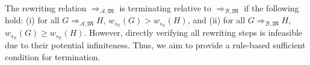 The rewriting relation \( \Rightarrow_{\mathcal{A},\mathfrak{M}} \) is terminating relative to $\Rightarrow_{\mathcal{B},\mathfrak{M}}$ if the following hold: (i) for all \(G \Rightarrow_{\mathcal{A},\mathfrak{M}} H\), \( w_{s_\mathbb{X}}(G) > w_{s_\mathbb{X}}(H) \), and (ii) for all \(G \Rightarrow_{\mathcal{B},\mathfrak{M}} H\), \( w_{s_\mathbb{X}}(G) \geq w_{s_\mathbb{X}}(H) \). However, directly verifying all rewriting steps is infeasible due to their potential infiniteness. 
Thus, we aim to provide a rule-based sufficient condition for termination.
